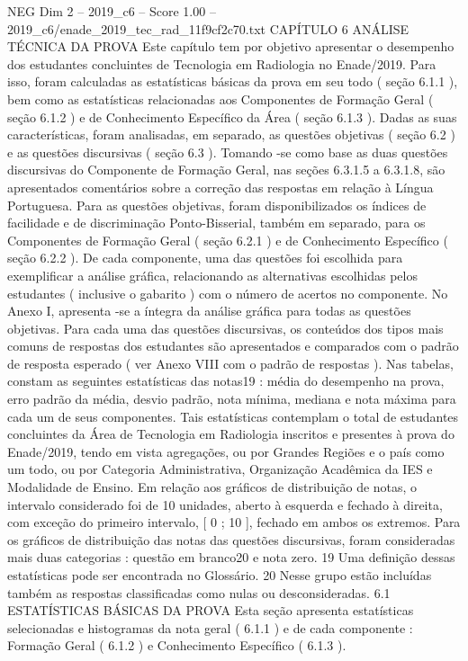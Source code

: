 \begin{textsample}{NEG Dim 2 – 2019\_c6 – Score 1.00 – 2019\_c6/enade\_2019\_tec\_rad\_11f9cf2c70.txt}  \label{ex:f2_neg_277}
CAPÍTULO 6 ANÁLISE TÉCNICA DA PROVA Este capítulo tem por objetivo apresentar o desempenho dos estudantes concluintes de Tecnologia em Radiologia no Enade/2019.
Para isso, foram calculadas as estatísticas básicas da prova em seu todo ( seção 6.1.1 ), bem como as estatísticas relacionadas aos Componentes de Formação Geral ( seção 6.1.2 ) e de Conhecimento Específico da Área ( seção 6.1.3 ).
Dadas as suas características, foram analisadas, em separado, as questões objetivas ( seção 6.2 ) e as questões discursivas ( seção 6.3 ).
Tomando -se como base as duas questões discursivas do Componente de Formação Geral, nas seções 6.3.1.5 a 6.3.1.8, são apresentados comentários sobre a correção das respostas em relação à Língua Portuguesa.
Para as questões objetivas, foram disponibilizados os índices de facilidade e de discriminação Ponto-Bisserial, também em separado, para os Componentes de Formação Geral ( seção 6.2.1 ) e de Conhecimento Específico ( seção 6.2.2 ).
De cada componente, uma das questões foi escolhida para exemplificar a análise gráfica, relacionando as alternativas escolhidas pelos estudantes ( inclusive o gabarito ) com o número de acertos no componente.
No Anexo I, apresenta -se a íntegra da análise gráfica para todas as questões objetivas.
Para cada uma das questões discursivas, os conteúdos dos tipos mais comuns de respostas dos estudantes são apresentados e comparados com o padrão de resposta esperado ( ver Anexo VIII com o padrão de respostas ).
Nas tabelas, constam as seguintes estatísticas das notas19 : média do desempenho na prova, erro padrão da média, desvio padrão, nota mínima, mediana e nota máxima para cada um de seus componentes.
Tais estatísticas contemplam o total de estudantes concluintes da Área de Tecnologia em Radiologia inscritos e presentes à prova do Enade/2019, tendo em vista agregações, ou por Grandes Regiões e o país como um todo, ou por Categoria Administrativa, Organização Acadêmica da IES e Modalidade de Ensino.
Em relação aos gráficos de distribuição de notas, o intervalo considerado foi de 10 unidades, aberto à esquerda e fechado à direita, com exceção do primeiro intervalo, [ 0 ; 10 ], fechado em ambos os extremos.
Para os gráficos de distribuição das notas das questões discursivas, foram consideradas mais duas categorias : questão em branco20 e nota zero. 19 Uma definição dessas estatísticas pode ser encontrada no Glossário. 20 Nesse grupo estão incluídas também as respostas classificadas como nulas ou desconsideradas. 6.1 ESTATÍSTICAS BÁSICAS DA PROVA Esta seção apresenta estatísticas selecionadas e histogramas da nota geral ( 6.1.1 ) e de cada componente : Formação Geral ( 6.1.2 ) e Conhecimento Específico ( 6.1.3 ).

\end{textsample}
